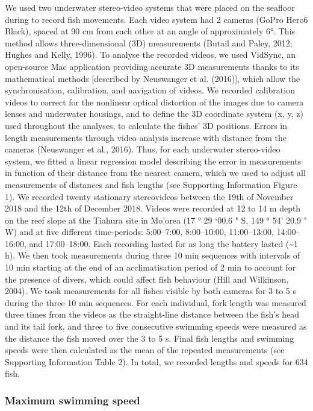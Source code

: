 \documentclass[12pt,a4paper]{article}
\begin{document}
\noindent We used two underwater stereo-video systems that were placed
on the seafloor during to record fish movements. Each video system had 2
cameras (GoPro Hero6 Black), spaced at 90 cm from each other at an angle
of approximately 6°. This method allows three-dimensional (3D)
measurements (Butail and Paley, 2012; Hughes and Kelly, 1996). To
analyse the recorded videos, we used VidSync, an open-source Mac
application providing accurate 3D measurements thanks to its
mathematical methods {[}described by Neuswanger et al. (2016){]}, which
allow the synchronisation, calibration, and navigation of videos. We
recorded calibration videos to correct for the nonlinear optical
distortion of the images due to camera lenses and underwater housings,
and to define the 3D coordinate system (x, y, z) used throughout the
analyses, to calculate the fishes' 3D positions. Errors in length
measurements through video analysis increase with distance from the
cameras (Neuswanger et al., 2016). Thus, for each underwater
stereo-video system, we fitted a linear regression model describing the
error in measurements in function of their distance from the nearest
camera, which we used to adjust all measurements of distances and fish
lengths (see Supporting Information Figure 1). We recorded twenty
stationary stereovideos between the 19th of November 2018 and the 12th
of December 2018. Videos were recorded at 12 to 14 m depth on the reef
slope at the Tiahura site in Mo'orea (17 ° 29 `00.6 " S, 149 ° 54' 20.9
" W) and at five different time-periods: 5:00--7:00, 8:00--10:00,
11:00--13:00, 14:00--16:00, and 17:00--18:00. Each recording lasted for
as long the battery lasted (\textasciitilde{}1 h). We then took
measurements during three 10 min sequences with intervals of 10 min
starting at the end of an acclimatisation period of 2 min to account for
the presence of divers, which could affect fish behaviour (Hill and
Wilkinson, 2004). We took measurements for all fishes visible by both
cameras for 3 to 5 s during the three 10 min sequences. For each
individual, fork length was measured three times from the videos as the
straight-line distance between the fish's head and its tail fork, and
three to five consecutive swimming speeds were measured as the distance
the fish moved over the 3 to 5 s. Final fish lengths and swimming speeds
were then calculated as the mean of the repeated measurements (see
Supporting Information Table 2). In total, we recorded lengths and
speeds for 634 fish.

\hypertarget{maximum-swimming-speed}{%
\subsubsection{Maximum swimming speed}\label{maximum-swimming-speed}}
\end{document}
